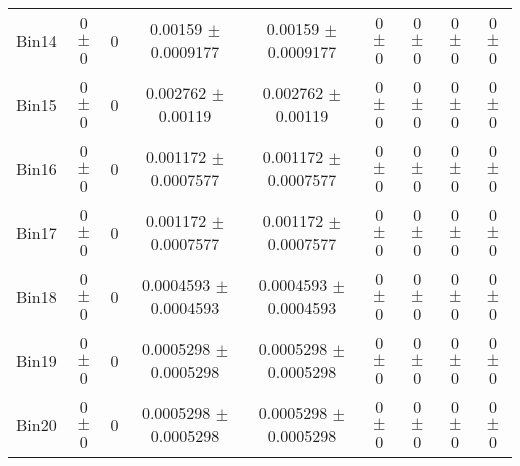 \begin{tabular}{@{\extracolsep{4pt}}lcccccccc@{}}
     Bin14 & 0 $\pm$ 0 & 0 & 0.00159 $\pm$ 0.0009177 & 0.00159 $\pm$ 0.0009177 & 0 $\pm$ 0 & 0 $\pm$ 0 & 0 $\pm$ 0 & 0 $\pm$ 0 \\ 
     Bin15 & 0 $\pm$ 0 & 0 & 0.002762 $\pm$ 0.00119 & 0.002762 $\pm$ 0.00119 & 0 $\pm$ 0 & 0 $\pm$ 0 & 0 $\pm$ 0 & 0 $\pm$ 0 \\ 
     Bin16 & 0 $\pm$ 0 & 0 & 0.001172 $\pm$ 0.0007577 & 0.001172 $\pm$ 0.0007577 & 0 $\pm$ 0 & 0 $\pm$ 0 & 0 $\pm$ 0 & 0 $\pm$ 0 \\ 
     Bin17 & 0 $\pm$ 0 & 0 & 0.001172 $\pm$ 0.0007577 & 0.001172 $\pm$ 0.0007577 & 0 $\pm$ 0 & 0 $\pm$ 0 & 0 $\pm$ 0 & 0 $\pm$ 0 \\ 
     Bin18 & 0 $\pm$ 0 & 0 & 0.0004593 $\pm$ 0.0004593 & 0.0004593 $\pm$ 0.0004593 & 0 $\pm$ 0 & 0 $\pm$ 0 & 0 $\pm$ 0 & 0 $\pm$ 0 \\ 
     Bin19 & 0 $\pm$ 0 & 0 & 0.0005298 $\pm$ 0.0005298 & 0.0005298 $\pm$ 0.0005298 & 0 $\pm$ 0 & 0 $\pm$ 0 & 0 $\pm$ 0 & 0 $\pm$ 0 \\ 
     Bin20 & 0 $\pm$ 0 & 0 & 0.0005298 $\pm$ 0.0005298 & 0.0005298 $\pm$ 0.0005298 & 0 $\pm$ 0 & 0 $\pm$ 0 & 0 $\pm$ 0 & 0 $\pm$ 0 \\ 
\hline\hline
  \end{tabular}
